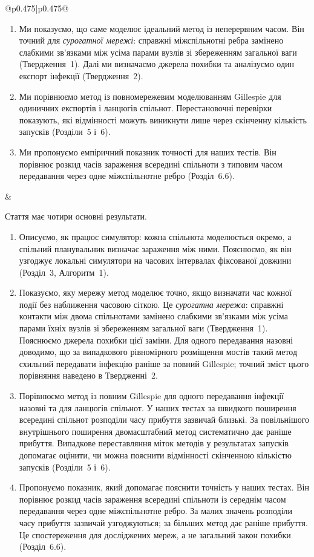 ﻿\documentclass[11pt]{article}
\begin{document}
\begin{longtable}{@{}p{0.475\textwidth}|p{0.475\textwidth}@{}}
\begin{minipage}[t]{\linewidth}
\begin{enumerate}
\item Ми показуємо, що саме моделює ідеальний метод із неперервним часом. Він точний для \emph{сурогатної мережі}: справжні міжспільнотні ребра замінено слабкими зв'язками між усіма парами вузлів зі збереженням загальної ваги (Твердження~1). Далі ми визначаємо джерела похибки та аналізуємо один експорт інфекції (Твердження~2).
\item Ми порівнюємо метод із повномережевим моделюванням Gillespie для одиничних експортів і ланцюгів спільнот. Перестановочні перевірки показують, які відмінності можуть виникнути лише через скінченну кількість запусків (Розділи~5 і~6).
\item Ми пропонуємо емпіричний показник точності для наших тестів. Він порівнює розкид часів зараження всередині спільноти з типовим часом передавання через одне міжспільнотне ребро (Розділ~6.6).
\end{enumerate}
\end{minipage} &
\begin{minipage}[t]{\linewidth}
Стаття має чотири основні результати.
\begin{enumerate}
\item Описуємо, як працює симулятор: кожна спільнота моделюється окремо, а спільний планувальник визначає зараження між ними. Пояснюємо, як він узгоджує локальні симулятори на часових інтервалах фіксованої довжини (Розділ~3, Алгоритм~1).
\item Показуємо, яку мережу метод моделює точно, якщо визначати час кожної події без наближення часовою сіткою. Це \emph{сурогатна мережа}: справжні контакти між двома спільнотами замінено слабкими зв'язками між усіма парами їхніх вузлів зі збереженням загальної ваги (Твердження~1). Пояснюємо джерела похибки цієї заміни. Для одного передавання назовні доводимо, що за випадкового рівномірного розміщення мостів такий метод схильний передавати інфекцію раніше за повний Gillespie; точний зміст цього порівняння наведено в Твердженні~2.
\item Порівнюємо метод із повним Gillespie для одного передавання інфекції назовні та для ланцюгів спільнот. У наших тестах за швидкого поширення всередині спільнот розподіли часу прибуття зазвичай близькі. За повільнішого внутрішнього поширення двомасштабний метод систематично дає раніше прибуття. Випадкове переставляння міток методів у результатах запусків допомагає оцінити, чи можна пояснити відмінності скінченною кількістю запусків (Розділи~5 і~6).
\item Пропонуємо показник, який допомагає пояснити точність у наших тестах. Він порівнює розкид часів зараження всередині спільноти із середнім часом передавання через одне міжспільнотне ребро. За малих значень розподіли часу прибуття зазвичай узгоджуються; за більших метод дає раніше прибуття. Це спостереження для досліджених мереж, а не загальний закон похибки (Розділ~6.6).

\end{enumerate}
\end{minipage}
\end{longtable}
\end{document}
